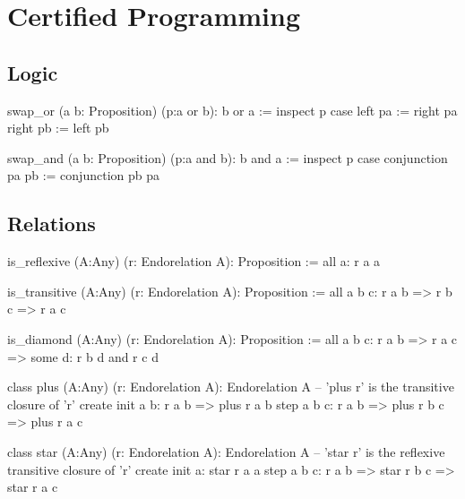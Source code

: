 
\chapter{Certified Programming}
\label{chap:certprog}





\newpage
\section{Logic}
\label{sec:certprog-logic}


\begin{alba}
  swap_or (a b: Proposition) (p:a or b): b or a :=
    inspect
      p
    case
      left  pa := right pa
      right pb := left  pb
\end{alba}



\begin{alba}
  swap_and (a b: Proposition) (p:a and b): b and a :=
    inspect
      p
    case
      conjunction pa pb :=
        conjunction pb pa
\end{alba}






\newpage
\section{Relations}
\label{sec:certprog-relations}

\begin{alba}
  is_reflexive (A:Any) (r: Endorelation A): Proposition :=
    all a: r a a

  is_transitive (A:Any) (r: Endorelation A): Proposition :=
    all a b c: r a b => r b c => r a c

  is_diamond (A:Any) (r: Endorelation A): Proposition :=
    all a b c: r a b => r a c => some d: r b d and r c d

  class
    plus (A:Any) (r: Endorelation A): Endorelation A
      -- 'plus r' is the transitive closure of 'r'
  create
    init a b: r a b => plus r a b
    step a b c: r a b => plus r b c => plus r a c

  class
    star (A:Any) (r: Endorelation A): Endorelation A
      -- 'star r' is the reflexive transitive closure of 'r'
  create
    init a: star r a a
    step a b c: r a b => star r b c => star r a c
\end{alba}







